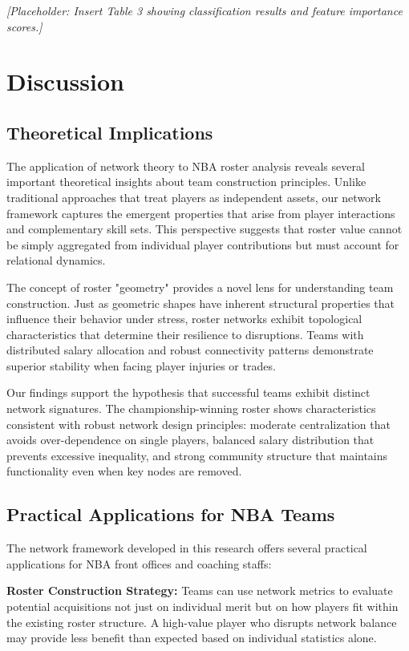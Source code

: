 \documentclass[11pt]{article}
\begin{document}
\textit{[Placeholder: Insert Table 3 showing classification results and feature importance scores.]}

\section{Discussion}

\subsection{Theoretical Implications}

The application of network theory to NBA roster analysis reveals several important theoretical insights about team construction principles. Unlike traditional approaches that treat players as independent assets, our network framework captures the emergent properties that arise from player interactions and complementary skill sets. This perspective suggests that roster value cannot be simply aggregated from individual player contributions but must account for relational dynamics.

The concept of roster "geometry" provides a novel lens for understanding team construction. Just as geometric shapes have inherent structural properties that influence their behavior under stress, roster networks exhibit topological characteristics that determine their resilience to disruptions. Teams with distributed salary allocation and robust connectivity patterns demonstrate superior stability when facing player injuries or trades.

Our findings support the hypothesis that successful teams exhibit distinct network signatures. The championship-winning roster shows characteristics consistent with robust network design principles: moderate centralization that avoids over-dependence on single players, balanced salary distribution that prevents excessive inequality, and strong community structure that maintains functionality even when key nodes are removed.

\subsection{Practical Applications for NBA Teams}

The network framework developed in this research offers several practical applications for NBA front offices and coaching staffs:

\textbf{Roster Construction Strategy:} Teams can use network metrics to evaluate potential acquisitions not just on individual merit but on how players fit within the existing roster structure. A high-value player who disrupts network balance may provide less benefit than expected based on individual statistics alone.
\end{document}
